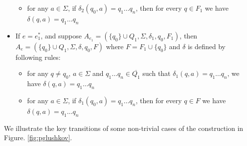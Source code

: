 \documentclass[sigplan,review,anonymous]{acmart}\settopmatter{printfolios=true,printccs=false,printacmref=false}
\begin{document}
\begin{itemize}
\begin{itemize}
    \item for any $a \in \Sigma$, if $\delta_2 (q_0, a) = q_1 \ldots q_n$,
    then for every $q \in F_1$ we have $\delta (q, a) = q_1 \ldots q_n$
  \end{itemize}
  \item If $e = e_1^{\ast}$, and suppose $A_{e_1} = (\{ q_0 \} \cup Q_1,
  \Sigma, \delta_1, q_0, F_1)$, then $A_e = (\{ q_0 \} \cup Q_1, \Sigma,
  \delta, q_0, F)$ where $F = F_1 \cup \{ q_0 \}$ and $\delta$ is defined by
  following rules:
  \begin{itemize}
    \item for any $q \neq q_0$, $a \in \Sigma$ and $q_1 \ldots q_n \in
    \overline{Q_1}$ such that $\delta_1 (q, a) = q_1 \ldots q_n$, we have
    $\delta (q, a) = q_1 \ldots q_n$
    
    \item for any $a \in \Sigma$, if $\delta_1 (q_0, a) = q_1 \ldots q_n$,
    then for every $q \in F$ we have $\delta (q, a) = q_1 \ldots q_n$
  \end{itemize}
\end{itemize}

We illustrate the key transitions of some non-trivial cases of the construction in Figure. \ref{fig:pglushkov}.
\end{document}
